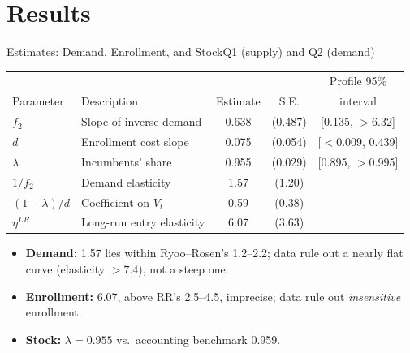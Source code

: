 \documentclass[10pt]{beamer}
\begin{document}
\section{Results}

\begin{frame}{Estimates: Demand, Enrollment, and Stock}{Q1 (supply) and Q2 (demand)}
  \begin{table}
    \centering\footnotesize
    \begin{tabular}{llccc}
      \toprule
      & & & & Profile 95\% \\
      Parameter & Description & Estimate & S.E. & interval \\
      \midrule
      $f_2$ & Slope of inverse demand & 0.638 & (0.487) & [0.135, $>$6.32] \\
      $d$ & Enrollment cost slope & 0.075 & (0.054) & [$<$0.009, 0.439] \\
      $\lambda$ & Incumbents' share & 0.955 & (0.029) & [0.895, $>$0.995] \\
      \midrule
      $1/f_2$ & Demand elasticity & \alert{1.57} & (1.20) & \\
      $(1-\lambda)/d$ & Coefficient on $V_t$ & 0.59 & (0.38) & \\
      $\eta^{LR}$ & Long-run entry elasticity & \alert{6.07} & (3.63) & \\
      \bottomrule
    \end{tabular}
  \end{table}
  \begin{itemize}\small
    \item \textbf{Demand:} 1.57 lies within Ryoo--Rosen's 1.2--2.2; data rule out a nearly flat curve (elasticity $>7.4$), not a steep one.
    \item \textbf{Enrollment:} 6.07, above RR's 2.5--4.5, imprecise; data rule out \emph{insensitive} enrollment.
    \item \textbf{Stock:} $\lambda=0.955$ vs.\ accounting benchmark 0.959.
  \end{itemize}
\end{frame}
\end{document}
